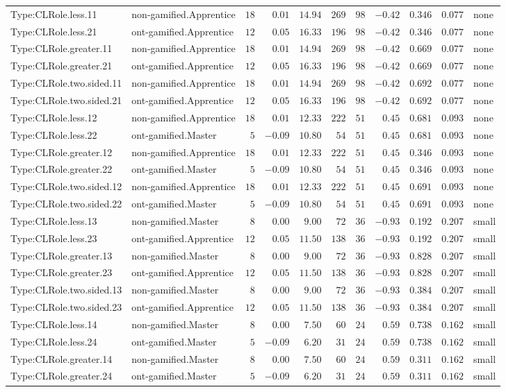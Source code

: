 \documentclass[6pt,a4paper]{article}
\begin{document}
{\begin{longtable}{llrrrrrrrrl}
Type:CLRole.less.11&non-gamified.Apprentice&$18$&$ 0.01$&$14.94$&$269$&$ 98$&$-0.42$&$0.346$&$0.077$&none\tabularnewline
Type:CLRole.less.21&ont-gamified.Apprentice&$12$&$ 0.05$&$16.33$&$196$&$ 98$&$-0.42$&$0.346$&$0.077$&none\tabularnewline
Type:CLRole.greater.11&non-gamified.Apprentice&$18$&$ 0.01$&$14.94$&$269$&$ 98$&$-0.42$&$0.669$&$0.077$&none\tabularnewline
Type:CLRole.greater.21&ont-gamified.Apprentice&$12$&$ 0.05$&$16.33$&$196$&$ 98$&$-0.42$&$0.669$&$0.077$&none\tabularnewline
Type:CLRole.two.sided.11&non-gamified.Apprentice&$18$&$ 0.01$&$14.94$&$269$&$ 98$&$-0.42$&$0.692$&$0.077$&none\tabularnewline
Type:CLRole.two.sided.21&ont-gamified.Apprentice&$12$&$ 0.05$&$16.33$&$196$&$ 98$&$-0.42$&$0.692$&$0.077$&none\tabularnewline
Type:CLRole.less.12&non-gamified.Apprentice&$18$&$ 0.01$&$12.33$&$222$&$ 51$&$ 0.45$&$0.681$&$0.093$&none\tabularnewline
Type:CLRole.less.22&ont-gamified.Master&$ 5$&$-0.09$&$10.80$&$ 54$&$ 51$&$ 0.45$&$0.681$&$0.093$&none\tabularnewline
Type:CLRole.greater.12&non-gamified.Apprentice&$18$&$ 0.01$&$12.33$&$222$&$ 51$&$ 0.45$&$0.346$&$0.093$&none\tabularnewline
Type:CLRole.greater.22&ont-gamified.Master&$ 5$&$-0.09$&$10.80$&$ 54$&$ 51$&$ 0.45$&$0.346$&$0.093$&none\tabularnewline
Type:CLRole.two.sided.12&non-gamified.Apprentice&$18$&$ 0.01$&$12.33$&$222$&$ 51$&$ 0.45$&$0.691$&$0.093$&none\tabularnewline
Type:CLRole.two.sided.22&ont-gamified.Master&$ 5$&$-0.09$&$10.80$&$ 54$&$ 51$&$ 0.45$&$0.691$&$0.093$&none\tabularnewline
Type:CLRole.less.13&non-gamified.Master&$ 8$&$ 0.00$&$ 9.00$&$ 72$&$ 36$&$-0.93$&$0.192$&$0.207$&small\tabularnewline
Type:CLRole.less.23&ont-gamified.Apprentice&$12$&$ 0.05$&$11.50$&$138$&$ 36$&$-0.93$&$0.192$&$0.207$&small\tabularnewline
Type:CLRole.greater.13&non-gamified.Master&$ 8$&$ 0.00$&$ 9.00$&$ 72$&$ 36$&$-0.93$&$0.828$&$0.207$&small\tabularnewline
Type:CLRole.greater.23&ont-gamified.Apprentice&$12$&$ 0.05$&$11.50$&$138$&$ 36$&$-0.93$&$0.828$&$0.207$&small\tabularnewline
Type:CLRole.two.sided.13&non-gamified.Master&$ 8$&$ 0.00$&$ 9.00$&$ 72$&$ 36$&$-0.93$&$0.384$&$0.207$&small\tabularnewline
Type:CLRole.two.sided.23&ont-gamified.Apprentice&$12$&$ 0.05$&$11.50$&$138$&$ 36$&$-0.93$&$0.384$&$0.207$&small\tabularnewline
Type:CLRole.less.14&non-gamified.Master&$ 8$&$ 0.00$&$ 7.50$&$ 60$&$ 24$&$ 0.59$&$0.738$&$0.162$&small\tabularnewline
Type:CLRole.less.24&ont-gamified.Master&$ 5$&$-0.09$&$ 6.20$&$ 31$&$ 24$&$ 0.59$&$0.738$&$0.162$&small\tabularnewline
Type:CLRole.greater.14&non-gamified.Master&$ 8$&$ 0.00$&$ 7.50$&$ 60$&$ 24$&$ 0.59$&$0.311$&$0.162$&small\tabularnewline
Type:CLRole.greater.24&ont-gamified.Master&$ 5$&$-0.09$&$ 6.20$&$ 31$&$ 24$&$ 0.59$&$0.311$&$0.162$&small\tabularnewline

\end{longtable}}
\end{document}
